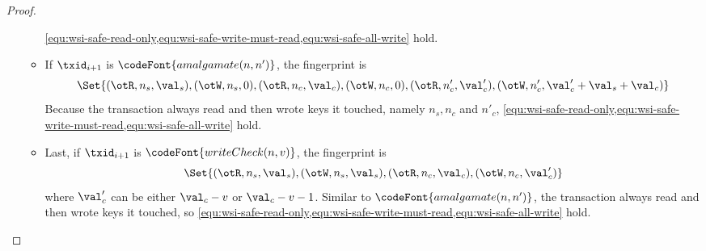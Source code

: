 \begin{proof}
\begin{itemize}
\begin{itemize}
                    \cref{equ:wsi-safe-read-only,equ:wsi-safe-write-must-read,equ:wsi-safe-all-write} hold.
                \item If  \( \txid_{i+1} \) is \( \codeFont{amalgamate(n,n')} \),
                    the fingerprint is
                    \[
                        \Set{(\otR, n_s, \val_s), (\otW, n_s, 0), (\otR, n_c, \val_c), (\otW, n_c, 0), (\otR, n'_c, \val'_c), (\otW, n'_c, \val'_c + \val_s + \val_c)} 
                    \]
                    Because the transaction always read and then wrote keys it touched, namely \( n_s, n_c \) and \( n'_c \), 
                    \cref{equ:wsi-safe-read-only,equ:wsi-safe-write-must-read,equ:wsi-safe-all-write} hold.
                \item Last, if \( \txid_{i+1} \) is \( \codeFont{writeCheck(n,v)} \),
                the fingerprint is
                \[
                    \Set{(\otR, n_s, \val_s), (\otW, n_s, \val_s), (\otR, n_c, \val_c), (\otW, n_c, \val'_c)} 
                \]
                where \( \val'_c \) can be either \( \val_c - v\) or \( \val_c - v - 1 \).
                Similar to \(  \codeFont{amalgamate(n,n')} \),
                the transaction always read and then wrote keys it touched,
                so \cref{equ:wsi-safe-read-only,equ:wsi-safe-write-must-read,equ:wsi-safe-all-write} hold.
            \end{itemize}
    \end{itemize}
\end{proof}
